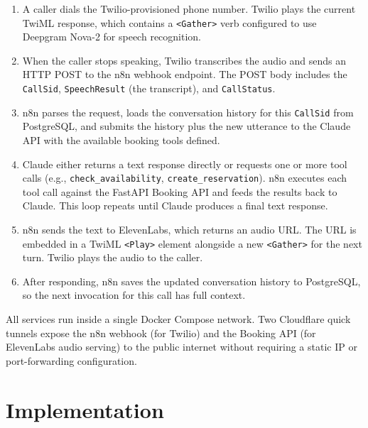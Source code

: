 \documentclass[conference]{IEEEtran}
\begin{document}
\begin{enumerate}
  \item A caller dials the Twilio-provisioned phone number. Twilio plays the
    current TwiML response, which contains a \texttt{<Gather>} verb configured
    to use Deepgram Nova-2 for speech recognition.

  \item When the caller stops speaking, Twilio transcribes the audio and sends
    an HTTP POST to the n8n webhook endpoint. The POST body includes the
    \texttt{CallSid}, \texttt{SpeechResult} (the transcript), and
    \texttt{CallStatus}.

  \item n8n parses the request, loads the conversation history for this
    \texttt{CallSid} from PostgreSQL, and submits the history plus the new
    utterance to the Claude API with the available booking tools defined.

  \item Claude either returns a text response directly or requests one or
    more tool calls (e.g., \texttt{check\_availability},
    \texttt{create\_reservation}). n8n executes each tool call against the
    FastAPI Booking API and feeds the results back to Claude. This loop
    repeats until Claude produces a final text response.

  \item n8n sends the text to ElevenLabs, which returns an audio URL. The
    URL is embedded in a TwiML \texttt{<Play>} element alongside a new
    \texttt{<Gather>} for the next turn. Twilio plays the audio to the caller.

  \item After responding, n8n saves the updated conversation history to
    PostgreSQL, so the next invocation for this call has full context.
\end{enumerate}

All services run inside a single Docker Compose network. Two Cloudflare quick
tunnels expose the n8n webhook (for Twilio) and the Booking API (for
ElevenLabs audio serving) to the public internet without requiring a static
IP or port-forwarding configuration.


\section{Implementation}
\label{sec:impl}
\end{document}
